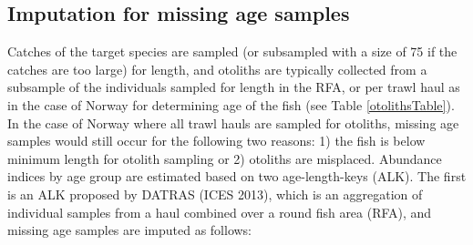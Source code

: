 \documentclass[a4paper 12pt]{article}
\numberwithin{equation}{section}
\begin{document}
\subsection{Imputation for missing age samples}
\label{imputation}
Catches of the target species are sampled (or subsampled with a size of 75 if the catches are too large) for length, and otoliths are typically collected from a subsample of the individuals sampled for length in the RFA,  or per trawl haul as in the case of Norway for determining age of the fish (see Table \ref{otolithsTable}). In the case of Norway where all trawl hauls are sampled for otoliths, missing age samples would still occur for the following two reasons: 1) the fish is below minimum length for otolith sampling or 2) otoliths are misplaced.  Abundance indices by age group are estimated based on two age-length-keys (ALK). The first is an ALK proposed by DATRAS (ICES 2013), which is an aggregation of individual samples from a haul combined over a round fish area (RFA), and missing age samples are imputed as follows: 
\end{document}
